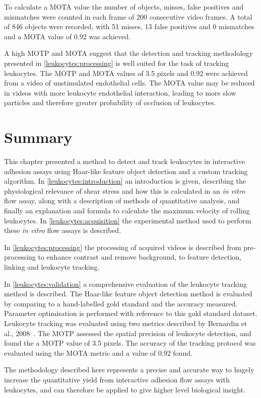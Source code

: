 To calculate a MOTA value the number of objects, misses, false positives and mismatches were counted in each frame of 200 consecutive video frames. A total of 846 objects were recorded, with 51 misses, 13 false positives and 0 mismatches and a MOTA value of 0.92 was achieved.

A high MOTP and MOTA suggest that the detection and tracking methodology presented in \autoref{leukocytes:processing} is well suited for the task of tracking leukocytes. The MOTP and MOTA values of 3.5 pixels and 0.92 were achieved from a video of unstimulated endothelial cells. The MOTA value may be reduced in videos with more leukocyte endothelial interaction, leading to more slow particles and therefore greater probability of occlusion of leukocytes.

\section{Summary}
\label{leukocytes:summary}
This chapter presented a method to detect and track leukocytes in interactive adhesion assays using Haar-like feature object detection and a custom tracking algorithm. In \autoref{leukocytes:introduction} an introduction is given, describing the physiological relevance of shear stress and how this is calculated in an \emph{in vitro} flow assay, along with a description of methods of quantitative analysis, and finally an explanation and formula to calculate the maximum velocity of rolling leukocytes. In \autoref{leukocytes:acquisition} the experimental method used to perform these \emph{in vitro} flow assays is described.

In \autoref{leukocytes:processing} the processing of acquired videos is described from pre-processing to enhance contrast and remove background, to feature detection, linking and leukocyte tracking. 

In \autoref{leukocytes:validation} a comprehensive evaluation of the leukocyte tracking method is described. The Haar-like feature object detection method is evaluated by comparing to a hand-labelled gold standard and the accuracy measured. Parameter optimisation is performed with reference to this gold standard dataset. Leukocyte tracking was evaluated using two metrics described by Bernardin et al., 2008~\cite{Bernardin2008}. The MOTP assessed the spatial precision of leukocyte detection, and found the a MOTP value of 3.5 pixels. The accuracy of the tracking protocol was evaluated using the MOTA metric and a value of 0.92 found.

The methodology described here represents a precise and accurate way to hugely increase the quantitative yield from interactive adhesion flow assays with leukocytes, and can therefore be applied to give higher level biological insight.
